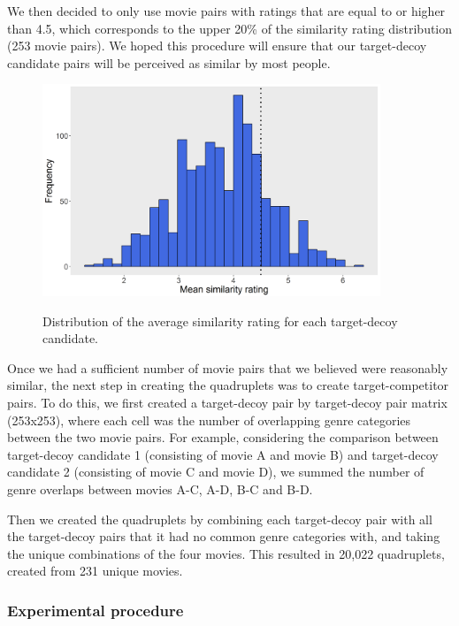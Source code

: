 \documentclass[11pt,a4paper]{article}
\begin{document}
We then decided to only use movie pairs with ratings that are equal to or higher than 4.5, which corresponds to the upper 20\% of the similarity rating distribution (253 movie pairs). We hoped this procedure will ensure that our target-decoy candidate pairs will be perceived as similar by most people. 



\begin{figure}
 \captionsetup{justification=centering}
\centering
\caption{Distribution of the average similarity rating for each target-decoy candidate.}
\includegraphics[width=0.9\textwidth]{exp2_pilot.png}
\label{fig:exp2_pilot}
\end{figure}

Once we had a sufficient number of movie pairs that we believed were reasonably similar, the next step in creating the quadruplets was to create target-competitor pairs. To do this, we first created a target-decoy pair by target-decoy pair matrix (253x253), where each cell was the number of overlapping genre categories between the two movie pairs. For example, considering the comparison between target-decoy candidate 1 (consisting of movie A and movie B) and target-decoy candidate 2 (consisting of movie C and movie D), we summed the number of genre overlaps between movies A-C, A-D, B-C and B-D.

 Then we created the quadruplets by combining each target-decoy pair with all the target-decoy pairs that it had no common genre categories with, and taking the unique combinations of the four movies. This resulted in 20,022 quadruplets, created from 231 unique movies.


\subsubsection{Experimental procedure}
\end{document}
